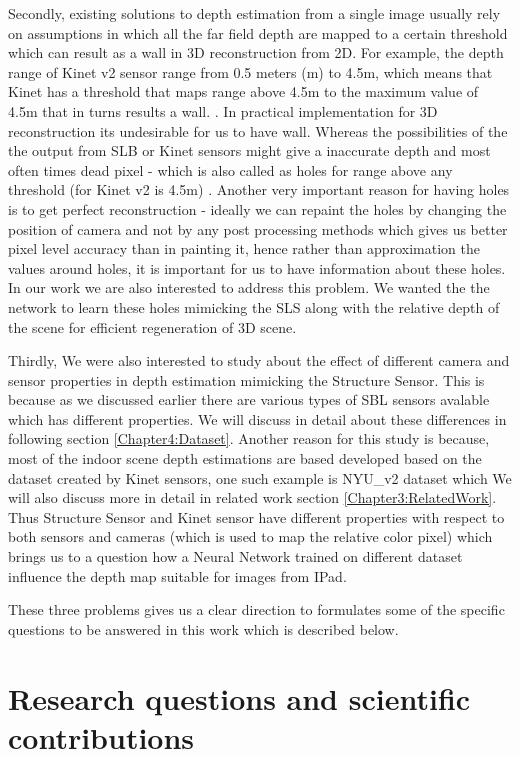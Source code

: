 Secondly, existing solutions to depth estimation from a single image usually rely on assumptions in which all the far field depth are mapped to a certain threshold which can result as a wall in 3D reconstruction from 2D. For example, the depth range of Kinet v2 sensor range from 0.5 meters (m) to 4.5m, which means that Kinet has a threshold that maps range above 4.5m to the maximum value of 4.5m that in turns results a wall. \cite{Silberman:ECCV12}. In practical implementation for 3D reconstruction its undesirable for us to have wall. Whereas the possibilities of the the output from SLB or Kinet sensors might give a inaccurate depth and most often times dead pixel - which is also called as holes for range above any threshold (for Kinet v2 is 4.5m) \cite{kinecttof}. Another very important reason for having holes is to get perfect reconstruction - ideally we can repaint the holes by changing the position of camera and not by any post processing methods which gives us better pixel level accuracy than in painting it, hence rather than approximation the values around holes, it is important for us to have information about these holes. In our work we are also interested to address this problem. We wanted the the network to learn these holes mimicking the SLS along with the relative depth of the scene for efficient regeneration of 3D scene. 

Thirdly, We were also interested to study about the effect of different camera and sensor properties in depth estimation mimicking the  Structure Sensor. This is because as we discussed earlier there are various types of SBL sensors avalable which has different properties. We will discuss in detail about these differences in following section \ref{Chapter4:Dataset}. Another reason for this study is because, most of the indoor scene depth estimations are based developed based on the dataset created by Kinet sensors, one such example is NYU\_v2 dataset \cite{silberman11indoor} which We will also discuss more in detail in related work section \ref{Chapter3:RelatedWork}. Thus Structure Sensor and Kinet sensor have different properties with respect to both sensors and cameras (which is used to map the relative color pixel) which brings us to a question how a Neural Network trained on different dataset influence the depth map suitable for images from IPad.  

These three problems gives us a clear direction to formulates some of the specific questions to be answered in this work which is described below. 


\section{Research questions and scientific contributions}

